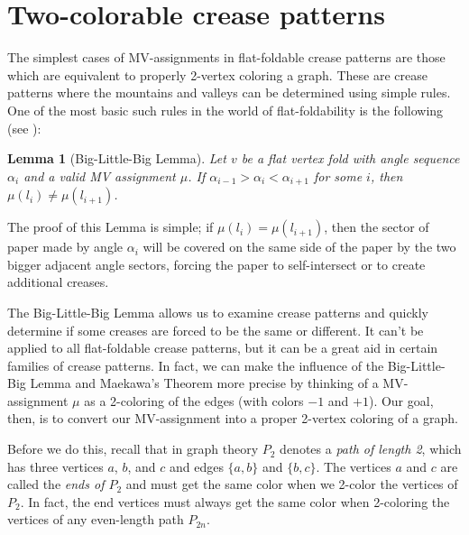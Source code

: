 \documentclass{amsart}
\newtheorem{lemma}[theorem]{Lemma}
\theoremstyle{definition}
\begin{document}
\section{Two-colorable crease patterns}



The simplest cases of MV-assignments in flat-foldable crease patterns are those which are equivalent to properly 2-vertex coloring a graph.  These are crease patterns where the mountains and valleys can be determined using simple rules.  One of the most basic such rules in the world of flat-foldability is the following (see \cite{DOR07}):

\begin{lemma}[Big-Little-Big Lemma]\label{lem:blb}
Let $v$ be a flat vertex fold with angle sequence $\alpha_i$ and a valid MV assignment $\mu$.  If $\alpha_{i-1}>\alpha_i<\alpha_{i+1}$ for some $i$, then $\mu(l_i)\not= \mu(l_{i+1})$.
\end{lemma}

The proof of this Lemma is simple; if $\mu(l_i)=\mu(l_{i+1})$, then the sector of paper made by angle $\alpha_i$ will be covered on the same side of the paper by the two bigger adjacent angle sectors, forcing the paper to self-intersect or to create additional creases.

The Big-Little-Big Lemma allows us to examine crease patterns and quickly determine if some creases are forced to be the same or different.  It can't be applied to all flat-foldable crease patterns, but it can be a great aid in certain families of crease patterns.  In fact, we can make the influence of the Big-Little-Big Lemma and Maekawa's Theorem more precise by thinking of  a MV-assignment $\mu$ as a 2-coloring of the edges (with colors $-1$ and $+1$).   Our goal, then, is to convert our MV-assignment into a proper 2-vertex coloring of a graph.


Before we do this, recall that in graph theory $P_2$ denotes a {\em path of length 2}, which has three vertices $a$, $b$, and $c$ and edges $\{a,b\}$ and $\{b,c\}$.  The vertices $a$ and $c$ are called the {\em ends of $P_2$} and must get the same color when we 2-color the vertices of $P_2$.  In fact, the end vertices must always get the same color when 2-coloring the vertices of any even-length path $P_{2n}$.
\end{document}
